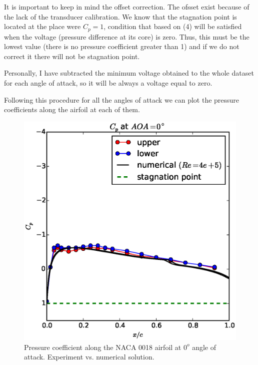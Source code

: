 \documentclass[10pt]{SelfArx} %
\begin{document}
It is important to keep in mind the offset correction. The ofsset exist because of the lack of the transducer calibration. We know that the stagnation point is located at the place were $C_{p} = 1$, condition that based on (4) will be satisfied when the voltage (pressure difference at its core) is zero. Thus, this must be the lowest value (there is no pressure coefficient greater than 1) and if we do not correct it there will not be stagnation point.

Personally, I have subtracted the minimum voltage obtained to the whole dataset for each angle of attack, so it will be always a voltage equal to zero.

Following this procedure for all the angles of attack we can plot the pressure coefficients along the airfoil at each of them.

\begin{figure}[ht!]
\centering
\includegraphics[scale=0.55]{plots/compared-cp-at-aoa0.eps} 
\caption{Pressure coefficient along the NACA 0018 airfoil at $0^{o}$ angle of attack. Experiment vs. numerical solution. }
\end{figure}
\end{document}
